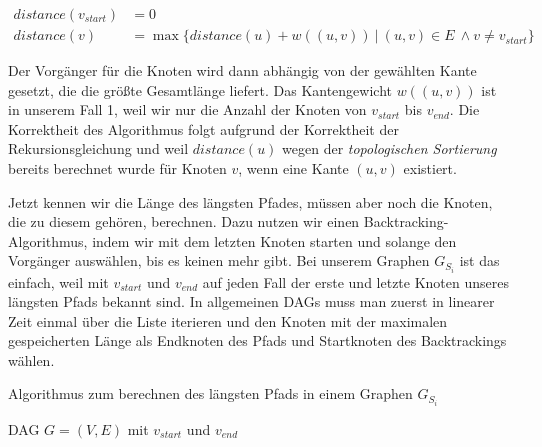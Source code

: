 \begin{equation}
\begin{split}
	distance(v_{start}) & = 0 \\
	distance(v)       & = \max\{distance(u) + w((u,v))\:|\:(u,v) \in E\ \wedge v \neq v_{start}\} 
\end{split}
\end{equation} 

Der Vorgänger für die Knoten wird dann abhängig von der gewählten Kante gesetzt, die die größte Gesamtlänge liefert. Das Kantengewicht $w((u,v))$ ist in unserem Fall 1, weil wir nur die Anzahl der Knoten von $v_{start}$ bis $v_{end}$. Die Korrektheit des Algorithmus folgt aufgrund der Korrektheit der Rekursionsgleichung und weil $distance(u)$ wegen der \emph{topologischen Sortierung} bereits berechnet wurde für Knoten $v$, wenn eine Kante $(u,v)$ existiert.

Jetzt kennen wir die Länge des längsten Pfades, müssen aber noch die Knoten, die zu diesem gehören, berechnen. Dazu nutzen wir einen Backtracking-Algorithmus, indem wir mit dem letzten Knoten starten und solange den Vorgänger auswählen, bis es keinen mehr gibt. Bei unserem Graphen $G_{S_i}$ ist das einfach, weil mit $v_{start}$ und $v_{end}$ auf jeden Fall der erste und letzte Knoten unseres längsten Pfads bekannt sind. In allgemeinen DAGs muss man zuerst in linearer Zeit einmal über die Liste iterieren und den Knoten mit der maximalen gespeicherten Länge als Endknoten des Pfads und Startknoten des Backtrackings wählen.

\begin{algorithm}
	\caption{Algorithmus zum berechnen des längsten Pfads in einem Graphen $G_{S_i}$}
	\label{alg:longestpath}
	\begin{algorithmic}[1]
		\Require DAG $G = (V,E)$ mit $v_{start}$ und $v_{end}$
			 
			\EndWhile
			 
			 
			\EndWhile
		\EndProcedure
	\end{algorithmic}
\end{algorithm}

